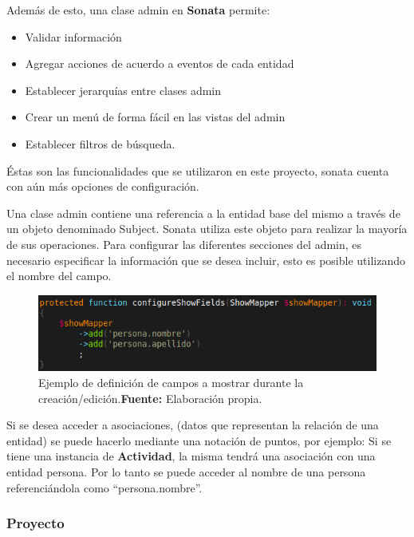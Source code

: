 \documentclass{article}
\begin{document}
\noindent
Además de esto, una clase admin en \textbf{Sonata} permite:
\begin{itemize}
    \item Validar información
    \item Agregar acciones de acuerdo a eventos de cada entidad
    \item Establecer jerarquías entre clases admin
    \item Crear un menú de forma fácil en las vistas del admin
    \item Establecer filtros de búsqueda.
\end{itemize}

Éstas son las funcionalidades que se utilizaron en este proyecto, sonata cuenta con aún más opciones de configuración.

Una clase admin contiene una referencia a la entidad base del mismo a través de un objeto denominado Subject. Sonata utiliza este objeto para realizar
la mayoría de sus operaciones.
Para configurar las diferentes secciones del admin, es necesario especificar la información que se desea incluir, esto es posible utilizando el nombre del campo.

\begin{figure}[h]
    \includegraphics[width=1\linewidth]{image/show.png}
    \caption{Ejemplo de definición de campos a mostrar durante la creación/edición.\newline \textbf{Fuente:} Elaboración propia.}
    \label{fig:image/show}
\end{figure}

Si se desea acceder a asociaciones, (datos que representan la relación de una entidad) se puede hacerlo mediante una notación de puntos, por ejemplo:
Si se tiene una instancia de \textbf{Actividad}, la misma tendrá una asociación con una entidad persona. Por lo tanto se puede acceder al nombre de una persona referenciándola como ``persona.nombre''.

\subsubsection{Proyecto}%
\label{ssub:admin_proyectadmin_proyecto}
\end{document}
